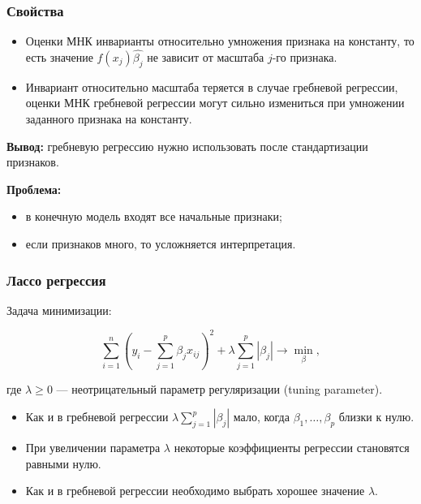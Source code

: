 \documentclass[unicode, notheorems]{beamer}
\begin{document}
\begin{frame}
\frametitle{Свойства}

\begin{itemize}
\item Оценки МНК инварианты относительно умножения признака на константу, то есть значение $f(x_j)\hat{\beta_j}$ не зависит от масштаба $j$-го признака. 
\item Инвариант относительно масштаба теряется в случае гребневой регрессии, оценки МНК гребневой регрессии могут сильно измениться при умножении заданного признака на константу.
\end{itemize}

\vspace{0.3cm}
\textbf{Вывод:} гребневую регрессию нужно использовать после стандартизации признаков.
\vspace{0.8cm}

\textbf{Проблема:} 
\begin{itemize}
\item в конечную модель входят все начальные признаки;
\item если признаков много, то усложняется интерпретация.
\end{itemize}


\end{frame}




\begin{frame}
\frametitle{Лассо регрессия}


Задача минимизации:


\[\sum_{i=1}^n(y_i - \sum_{j=1}^p \beta_j x_{ij})^2 + \lambda \sum_{j = 1}^p |\beta_j| \rightarrow \min_{\beta},\]

где $\lambda \geq 0$ --- неотрицательный параметр регуляризации (tuning parameter).

\begin{itemize}
\item Как и в гребневой регрессии $\lambda \sum_{j = 1}^p |\beta_j|$ мало, когда $\beta_1, \ldots, \beta_p$ близки к нулю.
\item При увеличении параметра $\lambda$ некоторые коэффициенты регрессии становятся равными нулю.
\item Как и в гребневой регрессии необходимо выбрать хорошее значение $\lambda$.
\end{itemize}



\end{frame}
\end{document}
